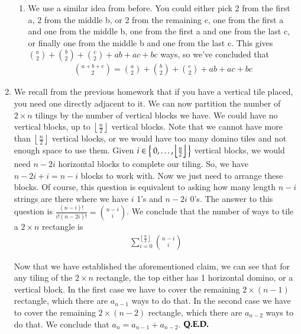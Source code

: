\documentclass[12pt]{article}
\theoremstyle{definitionstyle}
\newcommand{\floor}[1]{\left\lfloor#1\right\rfloor}
\begin{document}
\begin{enumerate}[leftmargin=\labelsep]
\begin{enumerate}
			\item We use a similar idea from before. You could either pick 2 from the first a, 2 from the middle b, or 2 from the remaining c, one from the first a and one from the middle b, one from the first a and one from the last c, or finally one from the middle b and one from the last c. This gives ${a \choose 2} + {b \choose 2} + {c \choose 2} + ab + ac + bc$ ways, so we've concluded that
			\begin{align*}
				\boxed{{a + b + c \choose 2} = {a \choose 2} + {b \choose 2} + {c \choose 2} + ab + ac + bc}
			\end{align*}
		\end{enumerate}
	
		\newpage
		\item We recall from the previous homework that if you have a vertical tile placed, you need one directly adjacent to it. We can now partition the number of $2 \times n$ tilings by the number of vertical blocks we have. We could have no vertical blocks, up to $\floor{\frac n2}$ vertical blocks. Note that we cannot have more than $\floor{\frac n2}$ vertical blocks, or we would have too many domino tiles and not enough space to use them. Given $i \in \Set{0, \ldots, \floor{\frac n2}}$ vertical blocks, we would need $n - 2i$ horizontal blocks to complete our tiling. So, we have $n-2i + i = n-i$ blocks to work with. Now we just need to arrange these blocks. Of course, this question is equivalent to asking how many length $n-i$ strings are there where we have $i$ 1's and $n-2i$ 0's. The answer to this question is $\frac{(n-i)!}{i! (n-2i)!} = {n-i \choose i}$. We conclude that the number of ways to tile a $2 \times n$ rectangle is 
		\begin{align*}
			\sum_{i=0}^{\floor{ \frac n2}} {n-i \choose i}
		\end{align*}
		
		Now that we have established the aforementioned claim, we can see that for any tiling of the $2 \times n$ rectangle, the top either has 1 horizontal domino, or a vertical block. In the first case we have to cover the remaining $2 \times (n-1)$ rectangle, which there are $a_{n-1}$ ways to do that. In the second case we have to cover the remaining $2 \times (n-2)$ rectangle, which there are $a_{n-2}$ ways to do that. We conclude that $a_n = a_{n-1} + a_{n-2}$. $\hfill \textbf{Q.E.D.}$
	

\end{enumerate}
\end{document}
